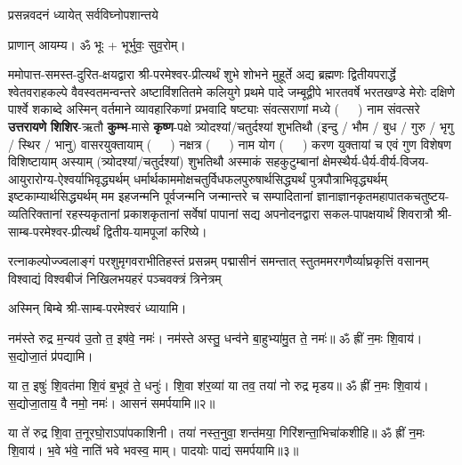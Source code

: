 

{प्रसन्नवदनं ध्यायेत् सर्वविघ्नोपशान्तये}
 
प्राणान्  आयम्य।  ॐ भूः + भूर्भुवः॒ सुव॒रोम्।

ममोपात्त-समस्त-दुरित-क्षयद्वारा श्री-परमेश्वर-प्रीत्यर्थं शुभे शोभने मुहूर्ते अद्य ब्रह्मणः
द्वितीयपरार्द्धे श्वेतवराहकल्पे वैवस्वतमन्वन्तरे अष्टाविंशतितमे कलियुगे प्रथमे पादे
जम्बूद्वीपे भारतवर्षे भरतखण्डे मेरोः दक्षिणे पार्श्वे शकाब्दे अस्मिन् वर्तमाने व्यावहारिकणां
 प्रभवादि षष्ट्याः संवत्सराणां मध्ये \mbox{(~~~)} नाम संवत्सरे \textbf{उत्तरायणे} 
\textbf{शिशिर}-ऋतौ  \textbf{कुम्भ}-मासे \textbf{कृष्ण}-पक्षे त्र्योदश्यां/चतुर्दश्यां शुभतिथौ
(इन्दु / भौम / बुध / गुरु / भृगु / स्थिर / भानु) वासरयुक्तायाम्
\mbox{(~~~)} नक्षत्र \mbox{(~~~)} नाम  योग  \mbox{(~~~)} करण युक्तायां च एवं गुण विशेषण विशिष्टायाम्
अस्याम् (त्र्योदश्यां/चतुर्दश्यां) शुभतिथौ 
अस्माकं सहकुटुम्बानां क्षेमस्थैर्य-धैर्य-वीर्य-विजय-आयुरारोग्य-ऐश्वर्याभिवृद्ध्यर्थम्
 धर्मार्थकाममोक्ष\-चतुर्विधफलपुरुषार्थसिद्ध्यर्थं पुत्रपौत्राभि\-वृद्ध्यर्थम् इष्टकाम्यार्थसिद्ध्यर्थम्
मम इहजन्मनि पूर्वजन्मनि जन्मान्तरे च सम्पादितानां ज्ञानाज्ञानकृतमहा\-पातकचतुष्टय-व्यतिरिक्तानां रहस्यकृतानां प्रकाशकृतानां सर्वेषां पापानां सद्य अपनोदनद्वारा सकल-पापक्षयार्थं शिवरात्रौ श्री-साम्ब-परमेश्वर-प्रीत्यर्थं द्वितीय-यामपूजां करिष्ये।


{रत्नाकल्पोज्ज्वलाङ्गं परशुमृगवराभीतिहस्तं प्रसन्नम्}
{पद्मासीनं समन्तात् स्तुतममरगणैर्व्याघ्रकृत्तिं वसानम्}
{विश्वाद्यं विश्वबीजं निखिलभयहरं पञ्चवक्त्रं त्रिनेत्रम्}

अस्मिन् बिम्बे श्री-साम्ब-परमेश्वरं ध्यायामि। 

नम॑स्ते रुद्र म॒न्यव॑ उ॒तो त॒ इष॑वे॒ नमः॑। नम॑स्ते अस्तु॒ धन्व॑ने बा॒हुभ्या॑मु॒त ते॒ नमः॑॥ ॐ ह्रीं न॒मः शि॒वाय॑। स॒द्योजा॒तं प्र॑पद्यामि।

या त॒ इषुः॑ शि॒वत॑मा शि॒वं ब॒भूव॑ ते॒ धनुः॑। शि॒वा श॑र॒व्या॑ या तव॒ तया॑ नो रुद्र मृडय॥ ॐ ह्रीं न॒मः शि॒वाय॑। स॒द्योजा॒ताय॒ वै नमो॒ नमः॑। आसनं समर्पयामि॥२॥

या ते॑ रुद्र शि॒वा त॒नूरघो॒राऽपा॑पकाशिनी। तया॑ नस्त॒नुवा॒ शन्त॑मया॒ गिरि॑शन्ता॒\-भिचा॑कशीहि॥ ॐ ह्रीं न॒मः शि॒वाय॑। भ॒वे भ॑वे॒ नाति॑ भवे भवस्व॒ माम्। पादयोः पाद्यं समर्पयामि॥३॥

